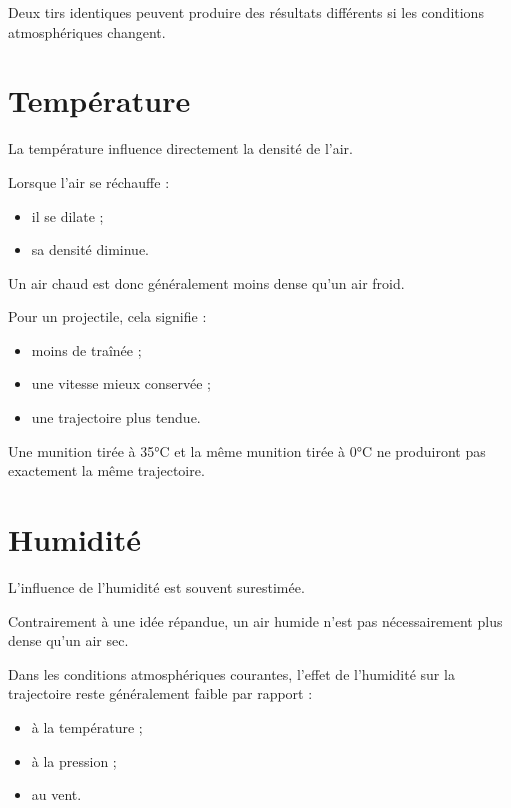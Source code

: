 \begin{aretenir}

Deux tirs identiques peuvent produire des résultats différents si les
conditions atmosphériques changent.

\end{aretenir}

\section{Température}

La température influence directement la densité de l'air.

Lorsque l'air se réchauffe :

\begin{itemize}
\item il se dilate ;
\item sa densité diminue.
\end{itemize}

Un air chaud est donc généralement moins dense qu'un air froid.

Pour un projectile, cela signifie :

\begin{itemize}
\item moins de traînée ;
\item une vitesse mieux conservée ;
\item une trajectoire plus tendue.
\end{itemize}

\begin{exemple}

Une munition tirée à 35°C et la même munition tirée à 0°C ne produiront
pas exactement la même trajectoire.

\end{exemple}

\section{Humidité}

L'influence de l'humidité est souvent surestimée.

Contrairement à une idée répandue, un air humide n'est pas nécessairement
plus dense qu'un air sec.

Dans les conditions atmosphériques courantes, l'effet de l'humidité sur la
trajectoire reste généralement faible par rapport :

\begin{itemize}
\item à la température ;
\item à la pression ;
\item au vent.
\end{itemize}

